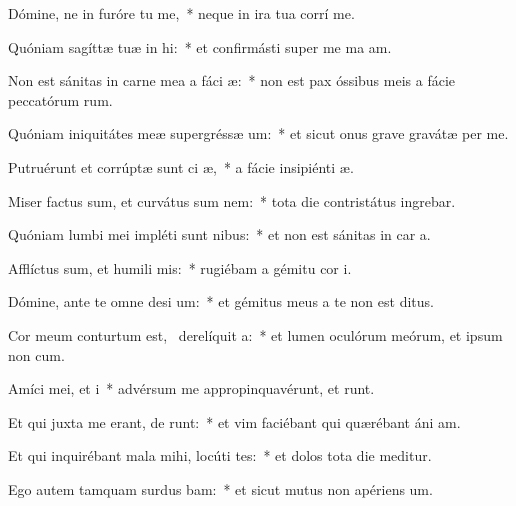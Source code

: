 \item Dómine, ne in furóre tu  me,~* neque in ira tua corrí me.
\item Quóniam sagíttæ tuæ in  hi:~* et confirmásti super me ma am.
\item Non est sánitas in carne mea a fáci  æ:~* non est pax óssibus meis a fácie peccatórum rum.
\item Quóniam iniquitátes meæ supergréssæ   um:~* et sicut onus grave gravátæ  per me.
\item Putruérunt et corrúptæ sunt ci æ,~* a fácie insipiénti æ.
\item Miser factus sum, et curvátus sum   nem:~* tota die contristátus ingrebar.
\item Quóniam lumbi mei impléti sunt nibus:~* et non est sánitas in car a.
\item Afflíctus sum, et humili  mis:~* rugiébam a gémitu cor i.
\item Dómine, ante te omne desi um:~* et gémitus meus a te non est ditus.
\item Cor meum conturtum est,~\pscross{} derelíquit   a:~* et lumen oculórum meórum, et ipsum non  cum.
\item Amíci mei, et  i~* advérsum me appropinquavérunt, et runt.
\item Et qui juxta me erant, de  runt:~* et vim faciébant qui quærébant áni am.
\item Et qui inquirébant mala mihi, locúti  tes:~* et dolos tota die meditur.
\item Ego autem tamquam surdus  bam:~* et sicut mutus non apériens  um.
